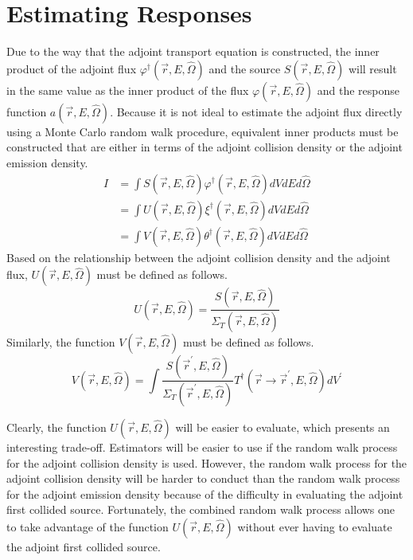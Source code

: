 \section{Estimating Responses}
Due to the way that the adjoint transport equation is constructed, the inner
product of the adjoint flux $\varphi^{\dagger}(\vec{r},E,\hat{\Omega})$ and the
source $S(\vec{r},E,\hat{\Omega})$ will result in the same value as the inner 
product of the flux $\varphi(\vec{r},E,\hat{\Omega})$ and the response
function $a(\vec{r},E,\hat{\Omega})$. Because it is not ideal to estimate the
adjoint flux directly using a Monte Carlo random walk procedure, equivalent
inner products must be constructed that are either in terms of the adjoint
collision density or the adjoint emission density.
\begin{align}
  I & = \int S(\vec{r},E,\hat{\Omega})\varphi^{\dagger}(\vec{r},E,\hat{\Omega})
  dV dE d\hat{\Omega} \\ 
  & = \int U(\vec{r},E,\hat{\Omega})\xi^{\dagger}(\vec{r},E,\hat{\Omega})
  dV dE d\hat{\Omega} \\
  & = \int V(\vec{r},E,\hat{\Omega})\theta^{\dagger}(\vec{r},E,\hat{\Omega})
  dV dE d\hat{\Omega}
  \label{eq:adj_emission_ip}
\end{align}
Based on the relationship between the adjoint collision density and the
adjoint flux, $U(\vec{r},E,\hat{\Omega})$ must be defined as follows.
\begin{equation}
  U(\vec{r},E,\hat{\Omega}) = \frac{S(\vec{r},E,\hat{\Omega})}
                                   {\Sigma_T(\vec{r},E,\hat{\Omega})}
\end{equation}
Similarly, the function $V(\vec{r},E,\hat{\Omega})$ must be defined as follows.
\begin{equation}
  V(\vec{r},E,\hat{\Omega}) = \int \frac{S(\vec{r}^{'},E,\hat{\Omega})}
  {\Sigma_T(\vec{r}^{'},E,\hat{\Omega})} 
  T^{\dagger}(\vec{r} \to \vec{r}^{'},E,\hat{\Omega}) dV^{'}
\end{equation}

Clearly, the function $U(\vec{r},E,\hat{\Omega})$ will be easier to evaluate,
which presents an interesting trade-off. Estimators will be easier to use if
the random walk process for the adjoint collision density is used. However, 
the random walk process for the adjoint collision density will be harder to 
conduct than the random walk process for the adjoint emission density because
of the difficulty in evaluating the adjoint first collided source. Fortunately,
the combined random walk process allows one to take advantage of the function
$U(\vec{r},E,\hat{\Omega})$ without ever having to evaluate the adjoint first 
collided source. 

